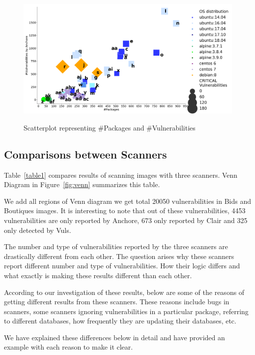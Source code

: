\documentclass[a4paper,num-refs]{oup-contemporary}
\begin{document}
\begin{Comments}
\begin{figure}[!htb]
        {\includegraphics[scale=2,width=\columnwidth]
        {Figures/vulngraph4.png}}
        \caption{\label{fig:graph1} Scatterplot representing \#Packages and \#Vulnerabilities}
      \end{figure}

\subsection{Comparisons between Scanners}

Table~\ref{table1} compares results of scanning images with three scanners.
Venn Diagram in Figure~\ref{fig:venn} summarizes this table. 

We add all regions of Venn diagram
we get total 20050 vulnerabilities in Bids and Boutiques images.
It is interesting to note that out of these vulnerabilities, 4453 vulnerabilities are only
reported by Anchore, 673 only reported by Clair and 325 only detected by Vuls.

The number and type of vulnerabilities reported by the three scanners are drastically different from each other.
The question arises why these scanners report different number and type of vulnerabilities.
How their logic differs and what exactly is making these results different than each other.

According to our investigation of these results, below are some of the reasons of
getting different results from these scanners. These reasons include bugs in scanners,
some scanners ignoring vulnerabilities in a particular package, referring to different databases,
how frequently they are updating their databases, etc. 

We have explained these differences below in detail
and have provided an example with each reason to make it clear.


\end{Comments}
\end{document}
